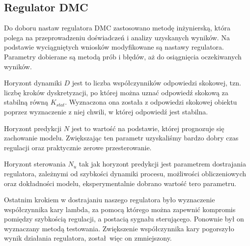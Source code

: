 %     

%     

%     


\subsection{Regulator DMC}
\label{projekt:zad4:DMC}

Do doboru nastaw regulatora DMC zastosowano metodę inżynierską, 
która polega na przeprowadzeniu doświadczeń i analizy uzyskanych wyników. 
Na podstawie wyciągniętych wniosków modyfikowane są nastawy regulatora. 
Parametry  dobierane są metodą prób i błędów, aż do osiągnięcia oczekiwanych wyników.

\indent Horyzont dynamiki $D$ jest to liczba współczynników odpowiedzi skokowej, 
tzn. liczbę kroków dyskretyzacji, po której można uznać odpowiedź skokową za stabilną równą $K_{stat}$. 
Wyznaczona ona została z odpowiedzi skokowej obiektu poprzez wyznaczenie z niej chwili, 
w której odpowiedź jest stabilna.

\indent Horyzont predykcji $N$ jest to wartość na podstawie, 
której prognozuje się zachowanie modelu. 
Zwiększając ten parametr uzyskaliśmy bardzo dobry czas regulacji oraz praktycznie zerowe przesterowanie.

\indent Horyzont sterowania $N_{u}$ tak jak horyzont predykcji jest parametrem dostrajania regulatora, 
zależnymi od szybkości dynamiki procesu, możliwości obliczeniowych oraz dokładności modelu, 
eksperymentalnie dobrano wartość tero parametru.

Ostatnim krokiem w dostrajaniu naszego regulatora było wyznaczenie współczynnika kary lambda, 
za pomocą którego można zapewnić kompromis pomiędzy szybkością regulacji, a postacią sygnału sterującego. 
Ponownie był on wyznaczany metodą testowania. 
Zwiększenie współczynnika kary pogorszyło wynik działania regulatora, został więc on zmniejszony.

